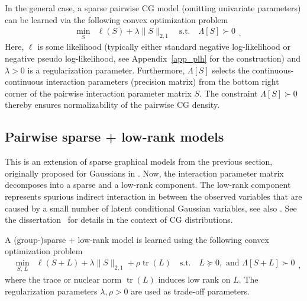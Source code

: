 \documentclass{article}
\DeclareMathOperator{\tr}{tr}
\begin{document}
In the general case, a sparse pairwise CG model (omitting univariate parameters) can be learned via the following convex optimization problem
\begin{equation}
\begin{array}{lrlr}
&\underset{S} {\min}& \ell(S) + \lambda \|S\|_{2,1} \quad \textrm{s.t.} \quad  \Lambda[S]\succ0
\end{array} \tag{S} \label{prob_S}.
\end{equation}
Here, $\ell$ is some likelihood (typically either standard negative log-likelihood or negative pseudo log-likelihood, see Appendix~\ref{app_plh} for the construction) and $\lambda>0$ is a regularization parameter. Furthermore, $\Lambda[S]$ selects the continuous-continuous interaction parameters (precision matrix) from the bottom right corner of the pairwise interaction parameter matrix $S$.
The constraint $\Lambda[S]\succ0$ thereby ensures normalizability of the pairwise CG density.

\subsection{Pairwise sparse + low-rank models}
This is an extension of sparse graphical models from the previous section, originally proposed for Gaussians in \cite{ChandrasekaranPW12}. Now, the interaction parameter matrix decomposes into a sparse and a low-rank component. The low-rank component represents spurious indirect interaction in between the observed variables that are caused by a small number of latent conditional Gaussian variables, see also \cite{nussbaum2019ising}.
See the dissertation~\cite{nussbaum2021models} for details in the context of CG distributions.

A (group-)sparse + low-rank model is learned using the following convex optimization problem
\begin{equation}
\begin{array}{lrlr}
&\underset{S, \, L} {\min}& \ell(S+L) + \lambda \|S\|_{2,1} + \rho \tr (L) \quad \textrm{s.t.} \quad L\succeq0, \text{ and } \Lambda[S+L]\succ0
\end{array}, \tag{SL} \label{prob_SL}
\end{equation}
where the trace or nuclear norm $\tr(L)$ induces low rank on $L$. 
The regularization parameters $\lambda, \rho >0$ are used as trade-off parameters.


\end{document}
